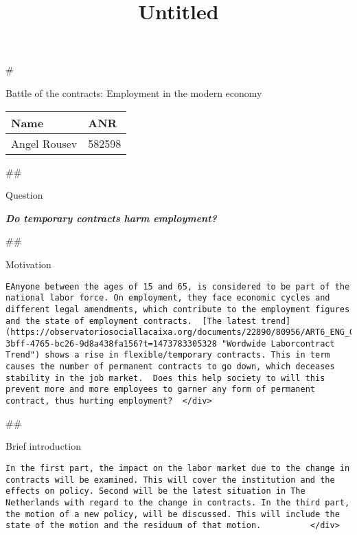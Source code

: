 \documentclass[11pt]{article}
\title{Untitled}
\begin{document}
    
    
    \maketitle
    
    

    
    \#

{Battle of the contracts: Employment in the modern economy}

    \begin{longtable}[]{@{}ll@{}}
\toprule
Name & ANR\tabularnewline
\midrule
\endhead
Angel Rousev & 582598\tabularnewline
\bottomrule
\end{longtable}

    \#\#

{Question}

\textbf{\emph{Do temporary contracts harm employment?}}

    \#\#

{Motivation}

\begin{verbatim}
EAnyone between the ages of 15 and 65, is considered to be part of the national labor force. On employment, they face economic cycles and different legal amendments, which contribute to the employment figures and the state of employment contracts.  [The latest trend](https://observatoriosociallacaixa.org/documents/22890/80956/ART6_ENG_Graph1.jpg/3605c46d-3bff-4765-bc26-9d8a438fa156?t=1473783305328 "Wordwide Laborcontract Trend") shows a rise in flexible/temporary contracts. This in term causes the number of permanent contracts to go down, which deceases stability in the job market.  Does this help society to will this prevent more and more employees to garner any form of permanent contract, thus hurting employment?  </div>
\end{verbatim}

    \#\#

{Brief introduction}

\begin{verbatim}
In the first part, the impact on the labor market due to the change in contracts will be examined. This will cover the institution and the effects on policy. Second will be the latest situation in The Netherlands with regard to the change in contracts. In the third part, the motion of a new policy, will be discussed. This will include the state of the motion and the residuum of that motion.          </div>
\end{verbatim}
\end{document}
